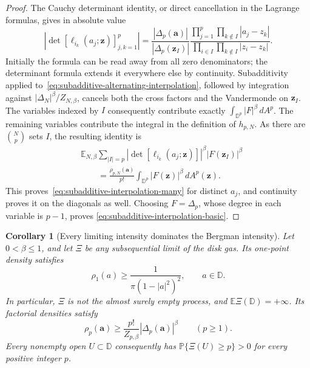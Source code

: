 \documentclass[11pt,a4paper]{article}
\numberwithin{equation}{section}
\newtheorem{corollary}[theorem]{Corollary}
\theoremstyle{definition}
\theoremstyle{remark}
\newcommand{\D}{\mathbb D}
\begin{document}
\begin{proof}
The Cauchy determinant identity, or direct cancellation in the
Lagrange formulas, gives in absolute value
\begin{equation}
 \left|\det[\ell_{i_k}(a_j;\mathbf z)]_{j,k=1}^p\right|
 =\frac{|\Delta_p(\mathbf a)|}{|\Delta_p(\mathbf z_I)|}
 \frac{\displaystyle\prod_{j=1}^p\prod_{k\notin I}|a_j-z_k|}
 {\displaystyle\prod_{i\in I}\prod_{k\notin I}|z_i-z_k|}.
 \label{eq:subadditive-cauchy-cancellation}
\end{equation}
Initially the formula can be read away from all zero denominators;
the determinant formula extends it everywhere else by continuity.
Subadditivity applied to~\eqref{eq:subadditive-alternating-interpolation},
followed by integration against $|\Delta_N|^\beta/Z_{N,\beta}$,
cancels both the cross factors and the Vandermonde on $\mathbf z_I$.
The variables indexed by $I$ consequently contribute exactly
$\int_{\D^p}|F|^\beta\,dA^p$. The remaining variables contribute
the integral in the definition of $h_{p,N}$. As there are
$\binom Np$ sets $I$, the resulting identity is
\begin{align*}
 &\mathbb E_{N,\beta}
 \sum_{|I|=p}
 \left|\det[\ell_{i_k}(a_j;\mathbf z)]\right|^\beta
 |F(\mathbf z_I)|^\beta\\
 &\qquad=\frac{\rho_{p,N}(\mathbf a)}{p!}
                         \int_{\D^p}|F(\mathbf z)|^\beta\,dA^p(\mathbf z).
\end{align*}
This proves~\eqref{eq:subadditive-interpolation-many} for distinct
$a_j$, and continuity proves it on the diagonals as well.
Choosing $F=\Delta_p$, whose degree in each variable is $p-1$, proves
\eqref{eq:subadditive-interpolation-basic}.
\end{proof}

\begin{corollary}[Every limiting intensity dominates the Bergman intensity]
\label{cor:subadditive-bergman-lower}
Let $0<\beta\le1$, and let $\Xi$ be any subsequential limit of the
disk gas. Its one-point density satisfies
\begin{equation}
 \rho_1(a)\ge\frac1{\pi(1-|a|^2)^2},\qquad a\in\D.
 \label{eq:subadditive-bergman-lower}
\end{equation}
In particular, $\Xi$ is not the almost surely empty process, and
$\mathbb E\Xi(\D)=+\infty$. Its factorial densities satisfy
\begin{equation}
 \rho_p(\mathbf a)\ge
       \frac{p!}{Z_{p,\beta}}|\Delta_p(\mathbf a)|^\beta
       \qquad(p\ge1).
 \label{eq:subadditive-limit-many}
\end{equation}
Every nonempty open $U\subset\D$ consequently has
$\mathbb P\{\Xi(U)\ge p\}>0$ for every positive integer $p$.
\end{corollary}
\end{document}
